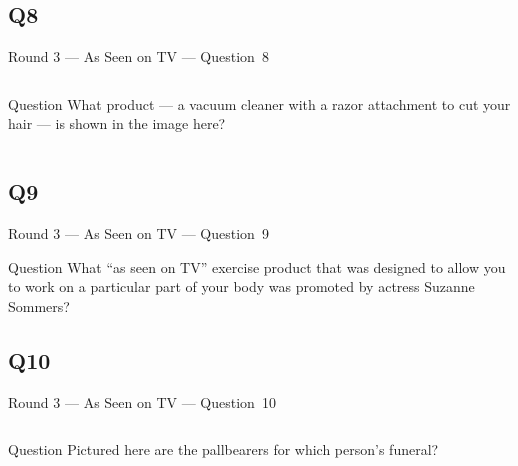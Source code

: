 \documentclass[11pt]{beamer}
\begin{document}
\subsection*{Q8}
\begin{frame}[t]{Round 3 --- As Seen on TV --- \mbox{Question 8}}
\vspace{-0.5em}
\begin{columns}[T,totalwidth=\linewidth]
\begin{column}{0.32\linewidth}
\begin{block}{Question}
What product --- a vacuum cleaner with a razor attachment to cut your hair --- is shown in the image here?
\end{block}
\end{column}
\begin{column}{0.65\linewidth}
\begin{center}
\texttt{[image: \{Images/flowbee]}.jpeg}
\end{center}
\end{column}
\end{columns}
\end{frame}
\subsection*{Q9}
\begin{frame}[t]{Round 3 --- As Seen on TV --- \mbox{Question 9}}
\vspace{-0.5em}
\begin{block}{Question}
What ``as seen on TV'' exercise product that was designed to allow you to work on a particular part of your body was promoted by actress Suzanne Sommers?
\end{block}
\end{frame}
\subsection*{Q10}
\begin{frame}[t]{Round 3 --- As Seen on TV --- \mbox{Question 10}}
\vspace{-0.5em}
\begin{columns}[T,totalwidth=\linewidth]
\begin{column}{0.32\linewidth}
\begin{block}{Question}
Pictured here are the pallbearers for which person's funeral?
\end{block}
\end{column}
\begin{column}{0.65\linewidth}
\begin{center}
\texttt{[image: \{Images/billymays]}.jpg}
\end{center}
\end{column}
\end{columns}
\end{frame}
\end{document}
